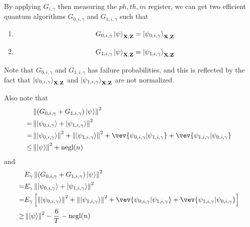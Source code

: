 \begin{rmk}\label{rmk:partition-projector}
 By applying $G_{i,\gamma}$ then measuring the $ph,th,in$ register, we can get two efficient quantum algorithms $G_{0,i,\gamma}$ and $G_{1,i,\gamma}$ such that 

\begin{enumerate}
    \item $$G_{0,i,\gamma}\ket{\psi}_{\mathbf{X},\mathbf{Z}}=\ket{\psi_{0,i,\gamma}}_{\mathbf{X},\mathbf{Z}} $$
\item  $$G_{1,i,\gamma}\ket{\psi}_{\mathbf{X},\mathbf{Z}}=\ket{\psi_{1,i,\gamma}}_{\mathbf{X},\mathbf{Z}} $$
\end{enumerate}


Note that $G_{0,i,\gamma}$ and $G_{1,i,\gamma}$ has failure probabilities, and this is reflected by the fact that $\ket{\psi_{0,i,\gamma}}_{\mathbf{X},\mathbf{Z}}$ and $\ket{\psi_{1,i,\gamma}}_{\mathbf{X},\mathbf{Z}}$ are not normalized. 

Also note that 
\begin{align}
   &\norm{( G_{0,i,\gamma}+G_{1,i,\gamma}) \ket{\psi}}^2 \nn \\
   =& \norm{\ket{\psi_{0,i,\gamma}}+\ket{\psi_{1,i,\gamma}}}^2 \nn \\
   =& \norm{\ket{\psi_{0,i,\gamma}}}^2+\norm{\ket{\psi_{1,i,\gamma}}}^2+\vev{\psi_{0,i,\gamma}|\psi_{1,i,\gamma}}+\vev{\psi_{1,i,\gamma}|\psi_{0,i,\gamma}} \nn \\
    \leq& \norm{\ket{\psi}}^2 +\negl(n)
\end{align}
and 
\begin{align}
   &E_\gamma \norm{( G_{0,i,\gamma}+G_{1,i,\gamma}) \ket{\psi}}^2 \nn \\
   =& E_\gamma\norm{\ket{\psi_{0,i,\gamma}}+\ket{\psi_{1,i,\gamma}}}^2 \nn \\
   =& E_\gamma\L[\norm{\ket{\psi_{0,i,\gamma}}}^2+\norm{\ket{\psi_{1,i,\gamma}}}^2+\vev{\psi_{0,i,\gamma}|\psi_{1,i,\gamma}}+\vev{\psi_{1,i,\gamma}|\psi_{0,i,\gamma}}\R] \nn \\
    \geq& \norm{\ket{\psi}}^2 -\frac{6}{T}-\negl(n)
\end{align}

\end{rmk}
